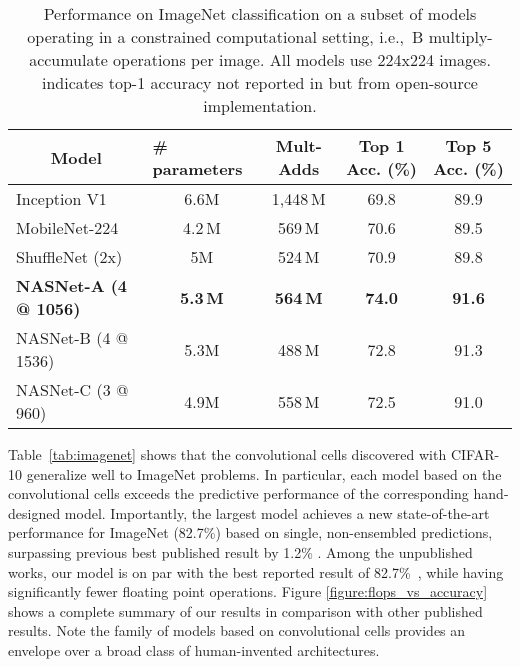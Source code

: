 \begin{table*}[h!]
\centering
\small
\begin{tabular}{l|cc|cc}
\toprule
\multicolumn{1}{c|}{\bf Model} & \multicolumn{1}{l}{\bf \# parameters} & \bf Mult-Adds & \bf Top 1 Acc. (\%) & \bf Top 5 Acc. (\%)  \\ \midrule
Inception V1~\cite{szegedy2015going} & 6.6M & 1,448\,M & 69.8 & 89.9 \\
MobileNet-224 \cite{howard2017mobilenets} & 4.2\,M & 569\,M & 70.6 & 89.5  \\
ShuffleNet (2x) \cite{shufflenet} &  5M & 524\,M & 70.9 & 89.8 \\
\midrule
\textbf{NASNet-A (4 @ 1056)} & \textbf{5.3\,M} & \textbf{564\,M} & \textbf{74.0} & \textbf{91.6} \\
NASNet-B (4 @ 1536) & 5.3M & 488\,M & 72.8 & 91.3  \\
NASNet-C (3 @ 960) & 4.9M & 558\,M & 72.5 & 91.0  \\
\bottomrule
\end{tabular}

\vspace{0.2cm}
\caption{Performance on ImageNet classification on a subset of models operating in a constrained computational setting, i.e., \,B multiply-accumulate operations per image. All models use 224x224 images.
 indicates top-1 accuracy not reported in \cite{szegedy2015going} but from open-source implementation.}
\label{tab:imagenet-constrained}
\end{table*}










Table~\ref{tab:imagenet} shows that the convolutional cells discovered with CIFAR-10 generalize well to ImageNet problems.
In particular, each model based on the convolutional cells exceeds the predictive performance of the corresponding hand-designed model.
Importantly, the largest model achieves a new state-of-the-art performance for ImageNet (82.7\%) based on single, non-ensembled predictions, surpassing previous best published result by 1.2\% \cite{dualpath}. Among the unpublished works, our model is on par with the best reported result of 82.7\%~\cite{hu2017squeeze}, while having significantly fewer floating point operations.
Figure \ref{figure:flops_vs_accuracy} shows a complete summary of our results in comparison with other published results. Note the family of models based on convolutional cells provides an envelope over a broad class of human-invented architectures.


